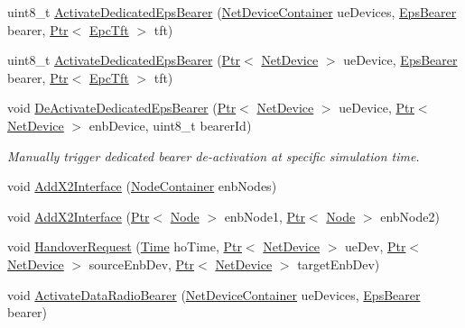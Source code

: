 \begin{DoxyCompactItemize}
uint8\+\_\+t \hyperlink{classns3_1_1LteHelper_af28041edd4c96bde1a2e07c90e363dcc}{Activate\+Dedicated\+Eps\+Bearer} (\hyperlink{classns3_1_1NetDeviceContainer}{Net\+Device\+Container} ue\+Devices, \hyperlink{structns3_1_1EpsBearer}{Eps\+Bearer} bearer, \hyperlink{classns3_1_1Ptr}{Ptr}$<$ \hyperlink{classns3_1_1EpcTft}{Epc\+Tft} $>$ tft)
\item 
uint8\+\_\+t \hyperlink{classns3_1_1LteHelper_a5f80fe3a483061ebe9345d51358ec185}{Activate\+Dedicated\+Eps\+Bearer} (\hyperlink{classns3_1_1Ptr}{Ptr}$<$ \hyperlink{classns3_1_1NetDevice}{Net\+Device} $>$ ue\+Device, \hyperlink{structns3_1_1EpsBearer}{Eps\+Bearer} bearer, \hyperlink{classns3_1_1Ptr}{Ptr}$<$ \hyperlink{classns3_1_1EpcTft}{Epc\+Tft} $>$ tft)
\item 
void \hyperlink{classns3_1_1LteHelper_a58e90297e466808af034b827870e089e}{De\+Activate\+Dedicated\+Eps\+Bearer} (\hyperlink{classns3_1_1Ptr}{Ptr}$<$ \hyperlink{classns3_1_1NetDevice}{Net\+Device} $>$ ue\+Device, \hyperlink{classns3_1_1Ptr}{Ptr}$<$ \hyperlink{classns3_1_1NetDevice}{Net\+Device} $>$ enb\+Device, uint8\+\_\+t bearer\+Id)
\begin{DoxyCompactList}\small\item\em Manually trigger dedicated bearer de-\/activation at specific simulation time. \end{DoxyCompactList}\item 
void \hyperlink{classns3_1_1LteHelper_adbbd435f439200097e88a2965668bc26}{Add\+X2\+Interface} (\hyperlink{classns3_1_1NodeContainer}{Node\+Container} enb\+Nodes)
\item 
void \hyperlink{classns3_1_1LteHelper_a63176eb4eda78b962bc6b07b3bd02b4d}{Add\+X2\+Interface} (\hyperlink{classns3_1_1Ptr}{Ptr}$<$ \hyperlink{classns3_1_1Node}{Node} $>$ enb\+Node1, \hyperlink{classns3_1_1Ptr}{Ptr}$<$ \hyperlink{classns3_1_1Node}{Node} $>$ enb\+Node2)
\item 
void \hyperlink{classns3_1_1LteHelper_a5b612c3b8d529e68b848cdca95838087}{Handover\+Request} (\hyperlink{classns3_1_1Time}{Time} ho\+Time, \hyperlink{classns3_1_1Ptr}{Ptr}$<$ \hyperlink{classns3_1_1NetDevice}{Net\+Device} $>$ ue\+Dev, \hyperlink{classns3_1_1Ptr}{Ptr}$<$ \hyperlink{classns3_1_1NetDevice}{Net\+Device} $>$ source\+Enb\+Dev, \hyperlink{classns3_1_1Ptr}{Ptr}$<$ \hyperlink{classns3_1_1NetDevice}{Net\+Device} $>$ target\+Enb\+Dev)
\item 
void \hyperlink{classns3_1_1LteHelper_ac896e16cf162e4beeaa292d39ab1b700}{Activate\+Data\+Radio\+Bearer} (\hyperlink{classns3_1_1NetDeviceContainer}{Net\+Device\+Container} ue\+Devices, \hyperlink{structns3_1_1EpsBearer}{Eps\+Bearer} bearer)

\end{DoxyCompactItemize}
